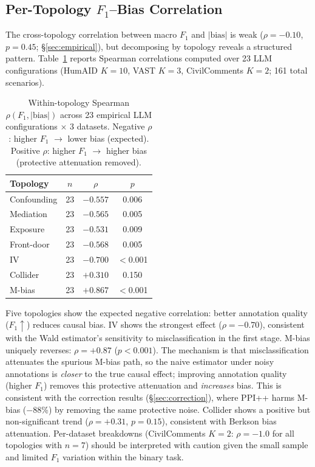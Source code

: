 \subsection{Per-Topology $F_1$--Bias Correlation}
\label{sec:within_topo_f1}

The cross-topology correlation between macro $F_1$ and $|\text{bias}|$ is weak ($\rho = -0.10$, $p = 0.45$; \S\ref{sec:empirical}), but decomposing by topology reveals a structured pattern. Table~\ref{tab:within_topo_f1} reports Spearman correlations computed over 23 LLM configurations (HumAID $K{=}10$, VAST $K{=}3$, CivilComments $K{=}2$; 161 total scenarios).

\begin{table}[h]
\centering
\small
\caption{Within-topology Spearman $\rho(F_1, |\text{bias}|)$ across 23 empirical LLM configurations $\times$ 3 datasets. Negative $\rho$: higher $F_1$ $\to$ lower bias (expected). Positive $\rho$: higher $F_1$ $\to$ higher bias (protective attenuation removed).}
\label{tab:within_topo_f1}
\begin{tabular}{lccc}
\toprule
\textbf{Topology} & $n$ & $\rho$ & $p$ \\
\midrule
Confounding & 23 & $-0.557$ & 0.006 \\
Mediation & 23 & $-0.565$ & 0.005 \\
Exposure & 23 & $-0.531$ & 0.009 \\
Front-door & 23 & $-0.568$ & 0.005 \\
IV & 23 & $-0.700$ & $<$0.001 \\
Collider & 23 & $+0.310$ & 0.150 \\
M-bias & 23 & $+0.867$ & $<$0.001 \\
\bottomrule
\end{tabular}
\end{table}

Five topologies show the expected negative correlation: better annotation quality ($F_1{\uparrow}$) reduces causal bias. IV shows the strongest effect ($\rho = -0.70$), consistent with the Wald estimator's sensitivity to misclassification in the first stage. M-bias uniquely reverses: $\rho = +0.87$ ($p < 0.001$). The mechanism is that misclassification attenuates the spurious M-bias path, so the naive estimator under noisy annotations is \emph{closer} to the true causal effect; improving annotation quality (higher $F_1$) removes this protective attenuation and \emph{increases} bias. This is consistent with the correction results (\S\ref{sec:correction}), where PPI++ harms M-bias ($-$88\%) by removing the same protective noise. Collider shows a positive but non-significant trend ($\rho = +0.31$, $p = 0.15$), consistent with Berkson bias attenuation. Per-dataset breakdowns (CivilComments $K{=}2$: $\rho = -1.0$ for all topologies with $n{=}7$) should be interpreted with caution given the small sample and limited $F_1$ variation within the binary task.

